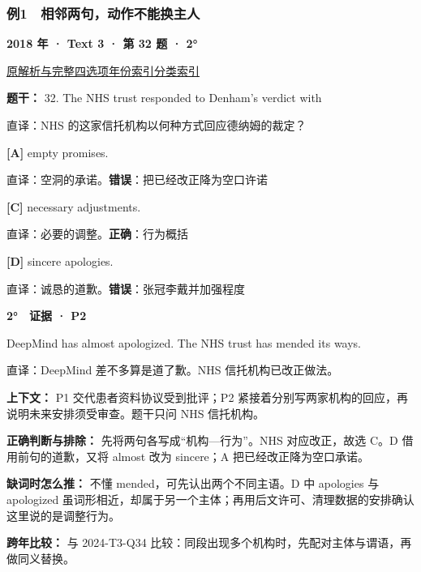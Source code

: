 \documentclass[11pt,a4paper]{article}
\begin{document}
\subsubsection{例1　相邻两句，动作不能换主人}\label{case-2018-T3-Q32}
\noindent\textbf{2018 年 · Text 3 · 第 32 题 · 2°}\par\noindent \href{https://zj139.github.io/math-notes/english/b56b3f9f18dc5d2535e35b75/\#q32}{原解析与完整四选项}\quad \hyperref[idx-2018-T3-Q32]{年份索引}\quad \hyperref[class-R01]{分类索引}\par\smallskip
\noindent\textbf{题干：} 32. The NHS trust responded to Denham’s verdict with\par\smallskip
直译：NHS 的这家信托机构以何种方式回应德纳姆的裁定？

\noindent\textbf{[A]} empty promises.\par\nopagebreak
\noindent 直译：空洞的承诺。\quad\textbf{错误}：把已经改正降为空口许诺\par\smallskip
{}\noindent\textbf{[C]} necessary adjustments.\par\nopagebreak
\noindent 直译：必要的调整。\quad\textbf{正确}：行为概括\par\smallskip
{}\noindent\textbf{[D]} sincere apologies.\par\nopagebreak
\noindent 直译：诚恳的道歉。\quad\textbf{错误}：张冠李戴并加强程度\par\smallskip
\begin{evidence}\textbf{2°　证据 · P2}\par DeepMind has almost apologized. The NHS trust has mended its ways.\par 直译：DeepMind 差不多算是道了歉。NHS 信托机构已改正做法。\end{evidence}
\noindent\textbf{上下文：} P1 交代患者资料协议受到批评；P2 紧接着分别写两家机构的回应，再说明未来安排须受审查。题干只问 NHS 信托机构。\par\smallskip
\noindent\textbf{正确判断与排除：} 先将两句各写成“机构—行为”。NHS 对应改正，故选 C。D 借用前句的道歉，又将 almost 改为 sincere；A 把已经改正降为空口承诺。\par\smallskip
\noindent\textbf{缺词时怎么推：} 不懂 mended，可先认出两个不同主语。D 中 apologies 与 apologized 虽词形相近，却属于另一个主体；再用后文许可、清理数据的安排确认这里说的是调整行为。\par\smallskip
\noindent\textbf{跨年比较：} 与 2024-T3-Q34 比较：同段出现多个机构时，先配对主体与谓语，再做同义替换。\par\smallskip
\clearpage
\end{document}
